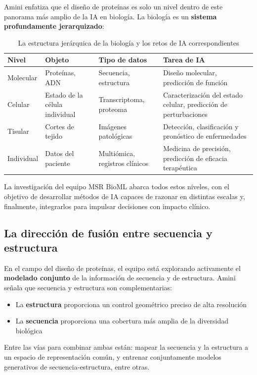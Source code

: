 \documentclass[a4paper]{article}
\begin{document}
Amini enfatiza que el diseño de proteínas es solo un nivel dentro de este panorama más amplio de la IA en biología. La biología es un \textbf{sistema profundamente jerarquizado}:

\begin{table}[H]
\centering
\caption{La estructura jerárquica de la biología y los retos de IA correspondientes}
\begin{tabular}{@{}llll@{}}
\toprule
\textbf{Nivel} & \textbf{Objeto} & \textbf{Tipo de datos} & \textbf{Tarea de IA} \\
\midrule
Molecular & Proteínas, ADN & Secuencia, estructura & Diseño molecular, predicción de función \\
Celular & Estado de la célula individual & Transcriptoma, proteoma & Caracterización del estado celular, predicción de perturbaciones \\
Tisular & Cortes de tejido & Imágenes patológicas & Detección, clasificación y pronóstico de enfermedades \\
Individual & Datos del paciente & Multiómica, registros clínicos & Medicina de precisión, predicción de eficacia terapéutica \\
\bottomrule
\end{tabular}
\end{table}

La investigación del equipo MSR BioML abarca todos estos niveles, con el objetivo de desarrollar métodos de IA capaces de razonar en distintas escalas y, finalmente, integrarlos para impulsar decisiones con impacto clínico.

\subsection{La dirección de fusión entre secuencia y estructura}

En el campo del diseño de proteínas, el equipo está explorando activamente el \textbf{modelado conjunto} de la información de secuencia y de estructura. Amini señala que secuencia y estructura son complementarias:

\begin{itemize}
    \item La \textbf{estructura} proporciona un control geométrico preciso de alta resolución
    \item La \textbf{secuencia} proporciona una cobertura más amplia de la diversidad biológica
\end{itemize}

Entre las vías para combinar ambas están: mapear la secuencia y la estructura a un espacio de representación común, y entrenar conjuntamente modelos generativos de secuencia-estructura, entre otras.
\end{document}
